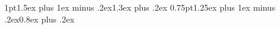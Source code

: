 \usepackage{titlesec}

\titlespacing*{\section}
{1pt}{1.5ex plus 1ex minus .2ex}{1.3ex plus .2ex}
\titlespacing*{\subsection}
{0.75pt}{1.25ex plus 1ex minus .2ex}{0.8ex plus .2ex}



\usepackage[portuguese,english]{babel}


\usepackage[utf8]{inputenc}
\usepackage[T1]{fontenc}

\usepackage{ulem} %
\normalem %
\raggedbottom %

\usepackage{datetime}

\usepackage{latexsym}

\usepackage{amsmath, amsthm, amssymb, amsfonts, amsbsy}
\DeclareMathOperator{\Tr}{Tr}

